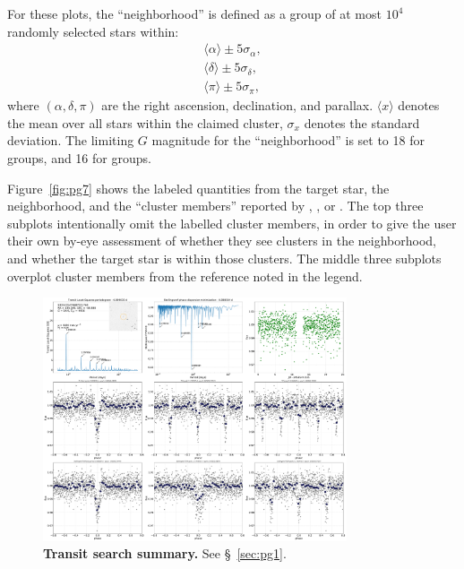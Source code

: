\documentclass[12pt,twocolumn,tighten]{aastex62}
\begin{document}
For these plots, the ``neighborhood'' is defined as a group of at
most $10^4$ randomly selected stars within:
\begin{align}
\langle \alpha \rangle \pm 5\sigma_\alpha, \\
\langle \delta \rangle \pm 5\sigma_\delta, \\
\langle \pi \rangle \pm 5\sigma_\pi,
\end{align}
where $(\alpha, \delta, \pi)$ are the right ascension,
declination, and parallax.
$\langle x \rangle$ denotes the mean over all stars within
the claimed cluster, $\sigma_x$ denotes the standard deviation.
The limiting $G$ magnitude for the ``neighborhood'' is set
to 18 for \citet{cantat-gaudin_gaia_2018} groups, and 16
for \cite{Kharchenko_et_al_2013} groups.

Figure~\ref{fig:pg7} shows the labeled quantities from the target
star, the neighborhood, and the ``cluster members'' reported by
\citet{cantat-gaudin_gaia_2018}, \cite{kounkel_untangling_2019}, or
\citet{Kharchenko_et_al_2013}.  The top three subplots intentionally
omit the labelled cluster members, in order to give the user their own
by-eye assessment of whether they see clusters in the neighborhood,
and whether the target star is within those clusters.
The middle three subplots overplot cluster members from the reference
noted in the legend.

\begin{figure}[!h]
	\begin{center}
		\leavevmode
		\includegraphics[width=0.8\textwidth]{pg_0001.pdf}
	\end{center}
	\vspace{-0.5cm}
	\caption{
    {\bf Transit search summary.} See \S~\ref{sec:pg1}.
		\label{fig:pg1}
	}
\end{figure}
\end{document}
